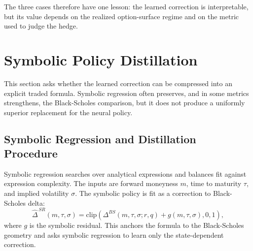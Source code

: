 \documentclass[a4paper,12pt]{article}
\numberwithin{equation}{section}
\begin{document}
\begin{table}[H]
    \centering
    \caption{Largest positive cluster contributions to the 2017 ordinary-variance gap. A cluster is a common 21-day episode start date. $\Delta$PnL and $\Delta$Reward are average agent-minus-Black-Scholes terminal P\&L and accumulated reward within the cluster. Excess Var. is $V_g/\sum_{h:V_h>0}V_h$, where $V_g$ is the cluster contribution defined in the text. Negative Agent--BS $\Delta$ means that the agent shorts less underlying than Black-Scholes on average within the cluster.}
    \label{tab:regime_2017_cluster_mechanism}
    \small
    
\end{table}

The three cases therefore have one lesson: the learned correction is interpretable, but its value depends on the realized option-surface regime and on the metric used to judge the hedge.

\section{Symbolic Policy Distillation}
\label{sec:symbolic_distillation}

This section asks whether the learned correction can be compressed into an explicit traded formula. Symbolic regression often preserves, and in some metrics strengthens, the Black-Scholes comparison, but it does not produce a uniformly superior replacement for the neural policy.

\subsection{Symbolic Regression and Distillation Procedure}

Symbolic regression searches over analytical expressions and balances fit against expression complexity. The inputs are forward moneyness $m$, time to maturity $\tau$, and implied volatility $\sigma$. The symbolic policy is fit as a correction to Black-Scholes delta:
\begin{equation}
    \widehat{\Delta}^{\,SR}(m,\tau,\sigma)
    =
    \mathrm{clip}\left(
        \Delta^{BS}(m,\tau,\sigma;r,q)
        +
        g(m,\tau,\sigma),
        0,1
    \right),
    \label{eq:sr_delta_residual}
\end{equation}
where $g$ is the symbolic residual. This anchors the formula to the Black-Scholes geometry and asks symbolic regression to learn only the state-dependent correction.
\end{document}
